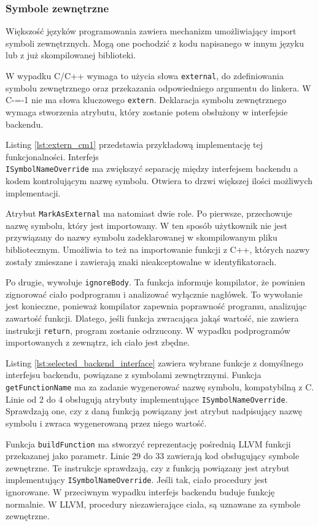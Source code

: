 \subsubsection{Symbole zewnętrzne}
Większość języków programowania zawiera mechanizm umożliwiający import symboli zewnętrznych.
Mogą one pochodzić z kodu napisanego w innym języku lub z już skompilowanej biblioteki.

W wypadku C/C++ wymaga to użycia słowa \lstinline{external}, do zdefiniowania symbolu zewnętrznego oraz przekazania odpowiedniego argumentu do linkera.
W C-=-1 nie ma słowa kluczowego \lstinline{extern}.
Deklaracja symbolu zewnętrznego wymaga stworzenia atrybutu, który zostanie potem obsłużony w interfejsie backendu.

Listing \ref{lst:extern_cm1} przedstawia przykładową implementację tej funkcjonalności.
Interfejs\\ \lstinline{ISymbolNameOverride} ma zwiększyć separację między interfejsem backendu a kodem kontrolującym nazwę symbolu.
Otwiera to drzwi większej ilości możliwych implementacji.

Atrybut \lstinline{MarkAsExternal} ma natomiast dwie role.
Po pierwsze, przechowuje nazwę symbolu, który jest importowany.
W ten sposób użytkownik nie jest przywiązany do nazwy symbolu zadeklarowanej w skompilowanym pliku bibliotecznym.
Umożliwia to też na importowanie funkcji z C++, których nazwy zostały zmieszane i zawierają znaki nieakceptowalne w identyfikatorach.

Po drugie, wywołuje \lstinline{ignoreBody}.
Ta funkcja informuje kompilator, że powinien zignorować ciało podprogramu i analizować wyłącznie nagłówek.
To wywołanie jest konieczne, ponieważ kompilator zapewnia poprawność programu, analizując zawartość funkcji.
Dlatego, jeśli funkcja zwracająca jakąś wartość, nie zawiera instrukcji \lstinline{return}, program zostanie odrzucony.
W wypadku podprogramów importowanych z zewnątrz, ich ciało jest zbędne.

Listing \ref{lst:selected_backend_interface} zawiera wybrane funkcje z domyślnego interfejsu backendu, powiązane z symbolami zewnętrznymi.
Funkcja \lstinline{getFunctionName} ma za zadanie wygenerować nazwę symbolu, kompatybilną z C.
Linie od 2 do 4 obsługują atrybuty implementujące \lstinline{ISymbolNameOverride}.
Sprawdzają one, czy z daną funkcją powiązany jest atrybut nadpisujący nazwę symbolu i zwraca wygenerowaną przez niego wartość.

Funkcja \lstinline{buildFunction} ma stworzyć reprezentację pośrednią LLVM funkcji przekazanej jako parametr.
Linie 29 do 33 zawierają kod obsługujący symbole zewnętrzne.
Te instrukcje sprawdzają, czy z funkcją powiązany jest atrybut implementujący \lstinline{ISymbolNameOverride}.
Jeśli tak, ciało procedury jest ignorowane.
W przeciwnym wypadku interfejs backendu buduje funkcję normalnie.
W LLVM, procedury niezawierające ciała, są uznawane za symbole zewnętrzne.

